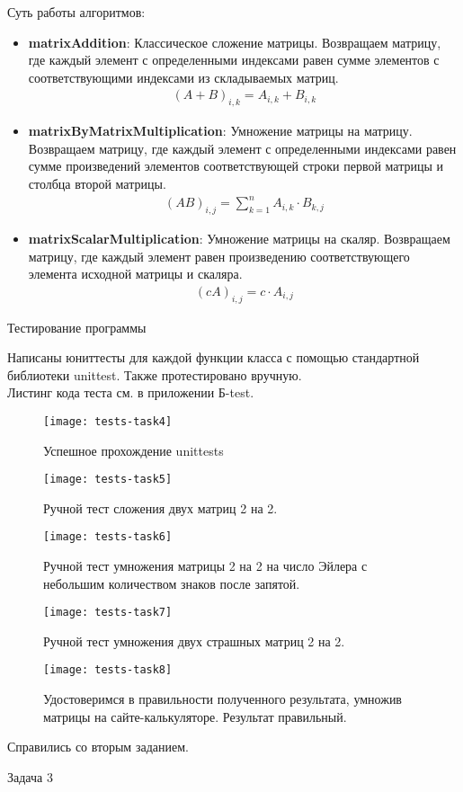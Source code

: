 Суть работы алгоритмов:
\begin{itemize}
	\item \textbf{matrixAddition}: Классическое сложение матрицы. Возвращаем матрицу, где каждый элемент с определенными индексами равен сумме элементов с соответствующими индексами из складываемых матриц.
	\begin{gather*}
		(A+B)_{i,k} = A_{i,k} + B_{i,k}
	\end{gather*}
	
	\item \textbf{matrixByMatrixMultiplication}: Умножение матрицы на матрицу. Возвращаем матрицу, где каждый элемент с определенными индексами равен сумме произведений элементов соответствующей строки первой матрицы и столбца второй матрицы.
	\begin{gather*}
		(AB)_{i,j} = \sum_{k=1}^{n} A_{i,k} \cdot B_{k,j}
	\end{gather*}
	
	\item \textbf{matrixScalarMultiplication}: Умножение матрицы на скаляр. Возвращаем матрицу, где каждый элемент равен произведению соответствующего элемента исходной матрицы и скаляра.
	\begin{gather*}
		(cA)_{i,j} = c \cdot A_{i,j}
	\end{gather*}
\end{itemize}
\begin{large}
	Тестирование программы\\
\end{large}
Написаны юниттесты для каждой функции класса с помощью стандартной библиотеки unittest. Также протестировано вручную.\\
Листинг кода теста см. в приложении Б-test.\\
\begin{figure}[H]
	\centering
	\texttt{[image: tests-task4]}
	\caption*{Успешное прохождение unittests}
	\label{fig:tests-task4}
\end{figure}
\begin{figure}[H]
	\centering
	\texttt{[image: tests-task5]}
	\caption*{Ручной тест сложения двух матриц 2 на 2.}
	\label{fig:tests-task5}
\end{figure}
\begin{figure}[H]
	\centering
	\texttt{[image: tests-task6]}
	\caption*{Ручной тест умножения матрицы 2 на 2 на число Эйлера с небольшим количеством знаков после запятой.}
	\label{fig:tests-task6}
\end{figure}
\begin{figure}[H]
	\centering
	\texttt{[image: tests-task7]}
	\caption*{Ручной тест умножения двух страшных матриц 2 на 2.}
	\label{fig:tests-task7}
\end{figure}
\begin{figure}[H]
	\centering
	\texttt{[image: tests-task8]}
	\caption*{Удостоверимся в правильности полученного результата, умножив матрицы на сайте-калькуляторе. Результат правильный.}
	\label{fig:tests-task8}
\end{figure}
Справились со вторым заданием. \vspace{2cm}

\begin{large}
	Задача 3\\
\end{large}



